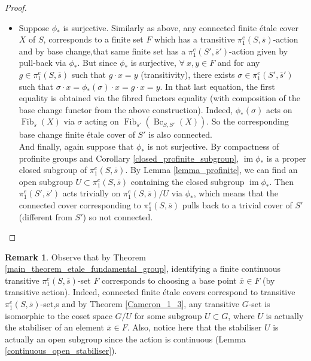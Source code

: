 \documentclass{article}
\theoremstyle{plain}
\theoremstyle{definition}
\newtheorem{remark}{Remark}
\DeclareMathOperator{\Fib}{Fib}
\DeclareMathOperator{\Bc}{Bc}
\DeclareMathOperator{\im}{im}
\begin{document}
\begin{proof}
\begin{itemize}
    \item[$b)$] Suppose $\phi_*$ is surjective. 
    Similarly as above, any connected finite \'etale cover $X$ of $S$, corresponds to a finite set $F$ which has a transitive $\pi^e_1(S,\overline{s})$-action and by base change,that same finite set has a $\pi^e_1(S',\overline{s}')$-action given by pull-back via $\phi_*$.
    But since $\phi_*$ is surjective, $\forall \:x,y\in F$ and for any $g\in\pi^e_1(S,\overline{s})$ such that $g\cdot x = y$ (transitivity), there exists $\sigma\in\pi^e_1(S',\overline{s}')$ such that $\sigma\cdot x=\phi_*(\sigma)\cdot x= g\cdot x = y$. 
    In that last equation, the first equality is obtained via the fibred functors equality (with composition of the base change functor from the above construction). 
    Indeed, $\phi_*(\sigma)$ acts on $\Fib_{\overline{s}}(X)$ via $\sigma$ acting on $\Fib_{\overline{s}'}(\Bc_{S,S'}(X))$.
    So the corresponding base change finite \'etale cover of $S'$ is also connected.\\
    And finally, again suppose that $\phi_*$ is not surjective.
    By compactness of profinite groups and Corollary \ref{closed_profinite_subgroup}, $\im\phi_*$ is a proper closed subgroup of $\pi^e_1(S,\overline{s})$.
    By Lemma \ref{lemma_profinite}, we can find an open subgroup $U\subset \pi^e_1(S,\overline{s})$ containing the closed subgroup $\im\phi_*$.
    Then $\pi^e_1(S',\overline{s}')$ acts trivially on $\pi^e_1(S,\overline{s})/U$ via $\phi_*$, which means that the connected cover corresponding to $\pi^e_1(S,\overline{s})$ pulls back to a trivial cover of $S'$ (different from $S'$) so not connected.
\end{itemize}
\end{proof}


\begin{remark}
\label{subgroup_stabiliser_etale}
    Observe that by Theorem \ref{main_theorem_etale_fundamental_group}, identifying a finite continuous transitive $\pi^e_1(S,\overline{s})$-set $F$ corresponds to choosing a base point $\overline{x}\in F$ (by transitive action). 
    Indeed, connected finite \'etale covers correspond to transitive $\pi^e_1(S,\overline{s})$-set,s and by Theorem \ref{Cameron_1_3}, any transitive $G$-set is isomorphic to the coset space $G/U$ for some subgroup $U\subset G$, where $U$ is actually the stabiliser of an element $\overline{x}\in F$.
    Also, notice here that the stabiliser $U$ is actually an open subgroup since the action is continuous (Lemma \ref{continuous_open_stabiliser}). 
\end{remark}
\end{document}

